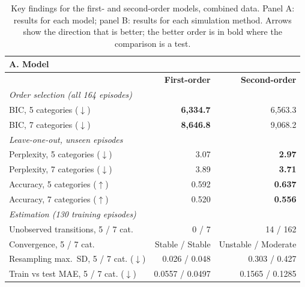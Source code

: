 \begin{table}[htbp]
\centering
\small
\caption{Key findings for the first- and second-order models, combined data. Panel A: results for each model; panel B: results for each simulation method. Arrows show the direction that is better; the better order is in bold where the comparison is a test.}
\label{tab:key_findings}
\setlength{\tabcolsep}{4pt}
\begin{tabular*}{\linewidth}{@{\extracolsep{\fill}}lrr}
\toprule
\multicolumn{3}{l}{\textbf{A. Model}} \\
\midrule
 & \textbf{First-order} & \textbf{Second-order} \\
\midrule
\textit{Order selection (all 164 episodes)} & & \\
\quad BIC, 5 categories ($\downarrow$) & \textbf{6,334.7} & 6,563.3 \\
\quad BIC, 7 categories ($\downarrow$) & \textbf{8,646.8} & 9,068.2 \\
\textit{Leave-one-out, unseen episodes} & & \\
\quad Perplexity, 5 categories ($\downarrow$) & 3.07 & \textbf{2.97} \\
\quad Perplexity, 7 categories ($\downarrow$) & 3.89 & \textbf{3.71} \\
\quad Accuracy, 5 categories ($\uparrow$) & 0.592 & \textbf{0.637} \\
\quad Accuracy, 7 categories ($\uparrow$) & 0.520 & \textbf{0.556} \\
\textit{Estimation (130 training episodes)} & & \\
\quad Unobserved transitions, 5 / 7 cat. & 0 / 7 & 14 / 162 \\
\quad Convergence, 5 / 7 cat. & Stable / Stable & Unstable / Moderate \\
\quad Resampling max.\ SD, 5 / 7 cat. ($\downarrow$) & 0.026 / 0.048 & 0.303 / 0.427 \\
\quad Train vs test MAE, 5 / 7 cat. ($\downarrow$) & 0.0557 / 0.0497 & 0.1565 / 0.1285 \\
\bottomrule
\end{tabular*}

\vspace{1em}


\end{table}
